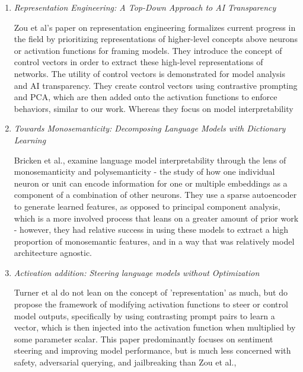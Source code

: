 \documentclass[11pt,a4paper]{article}
\begin{document}
\begin{enumerate}


\item \emph{Representation Engineering: A Top-Down Approach to AI Transparency} ~\cite{zou2023representation}

Zou et al's paper on representation engineering formalizes current progress in the field by prioritizing representations of higher-level concepts above neurons or activation functions for framing models. They introduce the concept of control vectors in order to extract these high-level representations of networks. The utility of control vectors is demonstrated for model analysis and AI transparency. They create control vectors using contrastive prompting and PCA, which are then added onto the activation functions to enforce behaviors, similar to our work. Whereas they focus on model interpretability 



\item \emph{Towards Monosemanticity: Decomposing Language Models with Dictionary Learning} ~\cite{bricken2023towards}

Bricken et al., examine language model interpretability through the lens of monosemanticity and polysemanticity - the study of how one individual neuron or unit can encode information for one or multiple embeddings as a component of a combination of other neurons. They use a sparse autoencoder to generate learned features, as opposed to principal component analysis, which is a more involved process that leans on a greater amount of prior work - however, they had relative success in using these models to extract a high proportion of monosemantic features, and in a way that was relatively model architecture agnostic.

\item \emph{Activation addition: Steering language models without Optimization}~\cite{turner2023activation}

Turner et al do not lean on the concept of 'representation' as much, but do propose the framework of modifying activation functions to steer or control model outputs, specifically by using contrasting prompt pairs to learn a vector, which is then injected into the activation function when multiplied by some parameter scalar.  This paper predominantly focuses on sentiment steering and improving model performance, but is much less concerned with safety, adversarial querying, and jailbreaking than Zou et al.,


\end{enumerate}
\end{document}
